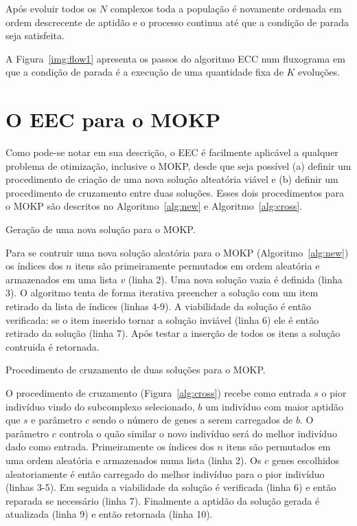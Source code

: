 Após evoluir todos os $N$ complexos toda a população é novamente ordenada
em ordem descrecente de aptidão e o processo continua até que a condição
de parada seja satisfeita.

A Figura~\ref{img:flow1} apresenta os passos do algoritmo ECC num fluxograma
em que a condição de parada é a execução de uma quantidade fixa de $K$ evoluções.


\section{O EEC para o MOKP}
Como pode-se notar em sua descrição, o EEC é facilmente aplicável a qualquer
problema de otimização, inclusive o MOKP, desde que seja possível (a) definir
um procedimento de criação de uma nova solução alteatória viável e (b) definir
um procedimento de cruzamento entre duas soluções.
Esses dois procedimentos para o MOKP são descritos no Algoritmo~\ref{alg:new}
e Algoritmo~\ref{alg:cross}.

\begin{algorithm}
  \caption{Geração de uma nova solução para o MOKP.}
  \label{alg:new}
\end{algorithm}

Para se contruir uma nova solução aleatória para o MOKP (Algoritmo~\ref{alg:new})
os índices dos $n$ itens são primeiramente permutados em ordem aleatória e
armazenados em uma lista $v$ (linha 2).
Uma nova solução vazia é definida (linha 3).
O algoritmo tenta de forma iterativa preencher a solução com um item retirado
da lista de índices (linhas 4-9).
A viabilidade da solução é então verificada: se o item inserido tornar a solução
inviável (linha 6) ele é então retirado da solução (linha 7).
Após testar a inserção de todos os itens a solução contruida é retornada.

\begin{algorithm}
  
  \caption{Procedimento de cruzamento de duas soluções para o MOKP.}
  \label{alg:cross}
\end{algorithm}

O procedimento de cruzamento (Figura~\ref{alg:cross}) recebe como entrada
$s$ o pior indivíduo vindo do subcomplexo selecionado, $b$ um indivíduo com
maior aptidão que $s$ e parâmetro $c$ sendo o número de genes a serem carregados de $b$.
O parâmetro $c$ controla o quão similar o novo indivíduo será do melhor indivíduo
dado como entrada.
Primeiramente os índices dos $n$ itens são permutados em uma ordem aleatória e armazenados numa lista
(linha 2).
Os $c$ genes escolhidos aleatoriamente é então carregado do melhor indivíduo para
o pior indivíduo (linhas 3-5).
Em seguida a viabilidade da solução é verificada (linha 6) e então reparada
se necessário (linha 7).
Finalmente a aptidão da solução gerada é atualizada (linha 9) e então retornada (linha 10).
